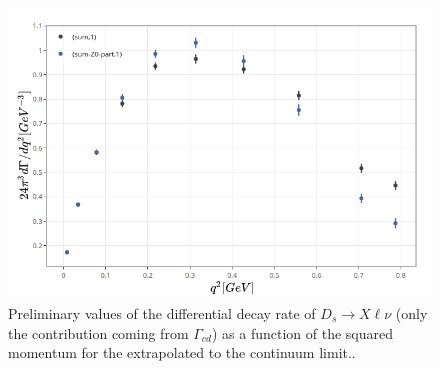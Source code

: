 


\begin{figure}
  \centering
  \includegraphics[scale=0.7]{plots/dgamma_dq2.png}
  \caption{Preliminary values of the differential decay rate of
    $D_s\to X\ell\nu$ (only the contribution coming from $\Gamma_{cd}$) as a function of the squared momentum for the
    extrapolated to the continuum limit..}
  \label{fig:dGammadq_Ds}
\end{figure}

